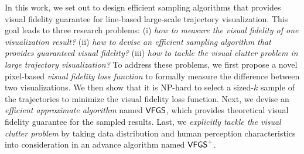 
In this work, we set out to design efficient sampling algorithms that provides visual fidelity guarantee for line-based large-scale trajectory visualization. This goal leads to three research problems: (i) \emph{how to measure the visual fidelity of one visualization result?} (ii) \emph{how to devise an efficient sampling algorithm that provides  guaranteed visual fidelity?} (iii) \emph{how to tackle the visual clutter problem in large trajectory visualization?} To address these problems, we first propose a novel pixel-based \textit{visual fidelity loss function} to formally measure the difference between two visualizations. We then show that it is NP-hard to select a sized-$k$ sample of the trajectories to minimize the visual fidelity loss function. Next, we devise an \textit{efficient approximate algorithm }named $\mathsf{VFGS}$, which provides theoretical visual fidelity guarantee for the sampled results. Last, we \textit{explicitly tackle the visual clutter problem} by taking data distribution and human perception characteristics into consideration in an advance algorithm named $\mathsf{VFGS}^{+}$.


